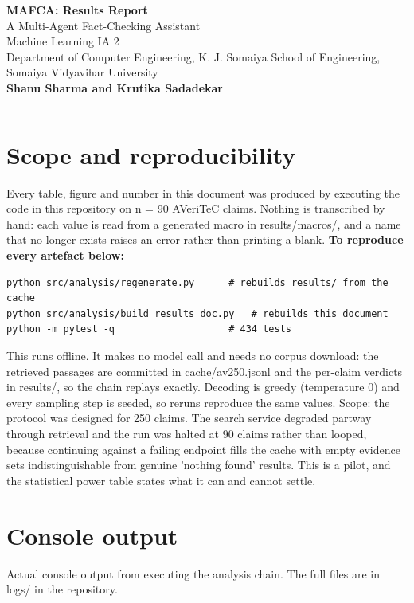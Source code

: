 \documentclass[11pt,a4paper]{article}
\begin{document}
\begin{center}
{\LARGE\bfseries MAFCA: Results Report}\\[4pt]
{\large A Multi-Agent Fact-Checking Assistant}\\[10pt]
Machine Learning IA 2\\[2pt]
Department of Computer Engineering, K. J. Somaiya School of Engineering, Somaiya Vidyavihar University\\[8pt]
\textbf{Shanu Sharma and Krutika Sadadekar}
\end{center}
\vspace{6pt}\hrule\vspace{10pt}
\section*{Scope and reproducibility}
Every table, figure and number in this document was produced by executing the code in this repository on n = 90 AVeriTeC claims. Nothing is transcribed by hand: each value is read from a generated macro in results/macros/, and a name that no longer exists raises an error rather than printing a blank.
\textbf{To reproduce every artefact below:}
\begin{verbatim}
python src/analysis/regenerate.py      # rebuilds results/ from the cache
python src/analysis/build_results_doc.py   # rebuilds this document
python -m pytest -q                    # 434 tests
\end{verbatim}
This runs offline. It makes no model call and needs no corpus download: the retrieved passages are committed in cache/av250.jsonl and the per-claim verdicts in results/, so the chain replays exactly. Decoding is greedy (temperature 0) and every sampling step is seeded, so reruns reproduce the same values.
Scope: the protocol was designed for 250 claims. The search service degraded partway through retrieval and the run was halted at 90 claims rather than looped, because continuing against a failing endpoint fills the cache with empty evidence sets indistinguishable from genuine 'nothing found' results. This is a pilot, and the statistical power table states what it can and cannot settle.
\clearpage
\section{Console output}
Actual console output from executing the analysis chain. The full files are in logs/ in the repository.
\end{document}

